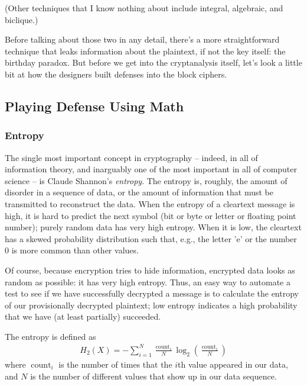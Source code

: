 (Other techniques that I know nothing about include integral,
algebraic, and biclique.)

Before talking about those two in any detail, there's a more
straightforward technique that leaks information about the plaintext,
if not the key itself: the birthday paradox.  But before we get into
the cryptanalysis itself, let's look a little bit at how the designers
built defenses into the block ciphers.

\subsection{Playing Defense Using Math}

\subsubsection{Entropy}

The single most important concept in cryptography -- indeed, in all of
information theory, and inarguably one of the most important in all of
computer science -- is Claude Shannon's \emph{entropy}.  The entropy is,
roughly, the amount of disorder in a sequence of data, or the amount
of information that must be transmitted to reconstruct the data.  When
the entropy of a cleartext message is high, it is hard to predict the
next symbol (bit or byte or letter or floating point number); purely
random data has very high entropy.  When it is low, the cleartext has
a skewed probability distribution such that, e.g., the letter 'e' or
the number 0 is more common than other values.

Of course, because encryption tries to hide information, encrypted
data looks as random as possible: it has very high entropy.  Thus, an
easy way to automate a test to see if we have successfully decrypted a
message is to calculate the entropy of our provisionally decrypted
plaintext; low entropy indicates a high probability that we have (at
least partially) succeeded.

The entropy is defined as
\begin{align}
H_{2}(X)=-\sum_{i=1}^{N} \frac{\operatorname{count}_{i}}{N} \log
_{2}\left(\frac{\operatorname{count}_{i}}{N}\right)
\end{align}
where $\operatorname{count}_i$ is the number of times that the $i$th
value appeared in our data, and $N$ is the number of different values
that show up in our data sequence.

